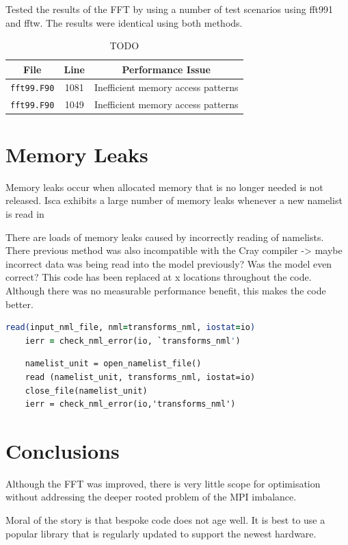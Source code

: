 \documentclass[a4paper,11pt]{report}
\begin{document}
Tested the results of the FFT by using a number of test scenarios using fft991 and fftw. The results were identical using both methods. 
\par


\begin{table}
\caption{TODO}
\begin{center}
\begin{tabular}{ c c c }
\toprule
File 					& Line 		& Performance Issue 					 \\\midrule
\texttt{fft99.F90}		& 1081		& Inefficient memory access patterns		  \\
\texttt{fft99.F90}		& 1049		& Inefficient memory access patterns		 \\
\bottomrule
\end{tabular}
\label{table:resolutions}
\end{center}
\end{table}





\section{Memory Leaks}
Memory leaks occur when allocated memory that is no longer needed is not released. Isca exhibits a large number of memory leaks whenever a new namelist is read in
\par
There are loads of memory leaks caused by incorrectly reading of namelists. There previous method was also incompatible with the Cray compiler -> maybe incorrect data was being read into the model previously? Was the model even correct? This code has been replaced at x locations throughout the code. Although there was no measurable performance benefit, this makes the code better.

\begin{lstlisting}[language=Fortran]
    read(input_nml_file, nml=transforms_nml, iostat=io)
    ierr = check_nml_error(io, `transforms_nml')
\end{lstlisting}

\begin{lstlisting}
    namelist_unit = open_namelist_file()
    read (namelist_unit, transforms_nml, iostat=io)
    close_file(namelist_unit)
    ierr = check_nml_error(io,'transforms_nml')
\end{lstlisting}





\section{Conclusions}
Although the FFT was improved, there is very little scope for optimisation without addressing the deeper rooted problem of the MPI imbalance.
\par
Moral of the story is that bespoke code does not age well. It is best to use a popular library that is regularly updated to support the newest hardware. 
\end{document}

